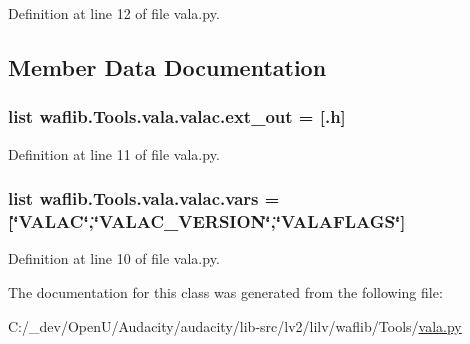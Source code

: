 Definition at line 12 of file vala.\+py.



\subsection{Member Data Documentation}
\subsubsection[{\texorpdfstring{ext\+\_\+out}{ext_out}}]{\setlength{\rightskip}{0pt plus 5cm}list waflib.\+Tools.\+vala.\+valac.\+ext\+\_\+out = \mbox{[}\textquotesingle{}.h\textquotesingle{}\mbox{]}\hspace{0.3cm}{\ttfamily [static]}}\hypertarget{classwaflib_1_1_tools_1_1vala_1_1valac_a25947a1acce51cf10cde7b8d66f932b6}{}\label{classwaflib_1_1_tools_1_1vala_1_1valac_a25947a1acce51cf10cde7b8d66f932b6}


Definition at line 11 of file vala.\+py.

\subsubsection[{\texorpdfstring{vars}{vars}}]{\setlength{\rightskip}{0pt plus 5cm}list waflib.\+Tools.\+vala.\+valac.\+vars = \mbox{[}\char`\"{}V\+A\+L\+AC\char`\"{},\char`\"{}V\+A\+L\+A\+C\+\_\+\+V\+E\+R\+S\+I\+ON\char`\"{},\char`\"{}V\+A\+L\+A\+F\+L\+A\+GS\char`\"{}\mbox{]}\hspace{0.3cm}{\ttfamily [static]}}\hypertarget{classwaflib_1_1_tools_1_1vala_1_1valac_a0ee3c3bbaf3101f29bb38f1cda5befa8}{}\label{classwaflib_1_1_tools_1_1vala_1_1valac_a0ee3c3bbaf3101f29bb38f1cda5befa8}


Definition at line 10 of file vala.\+py.



The documentation for this class was generated from the following file\+:\begin{DoxyCompactItemize}
\item 
C\+:/\+\_\+dev/\+Open\+U/\+Audacity/audacity/lib-\/src/lv2/lilv/waflib/\+Tools/\hyperlink{lilv_2waflib_2_tools_2vala_8py}{vala.\+py}\end{DoxyCompactItemize}
